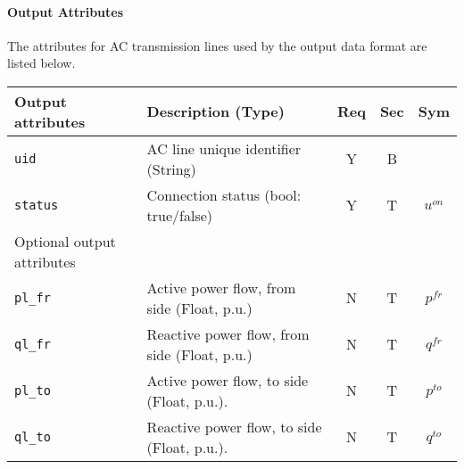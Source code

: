 \documentclass{article}
\begin{document}


\paragraph{Output Attributes}
The attributes for AC transmission lines used by the output data format are listed below.
\begin{center}
\small
\begin{tabular}{ l | l | c | c | c |}
Output attributes & Description (Type)& Req & Sec & Sym\\
\hline
 {\tt uid} & AC line unique identifier (String)& Y & B & \\
 {\tt status} & Connection status (bool: true/false) & Y & T & $u^{on}$ \\
\hline
  Optional output attributes &   &  & & \\
\hline
 {\tt pl\_fr} & Active power flow, from side (Float, p.u.)  & N & T & $p^{fr}$ \\
 {\tt ql\_fr} & Reactive power flow, from side (Float, p.u.)& N & T & $q^{fr}$ \\
 {\tt pl\_to} & Active power flow, to side (Float, p.u.).   & N & T & $p^{to}$ \\
 {\tt ql\_to} & Reactive power flow, to side (Float, p.u.). & N & T & $q^{to}$ \\
\hline
\end{tabular}
\end{center}
\end{document}

